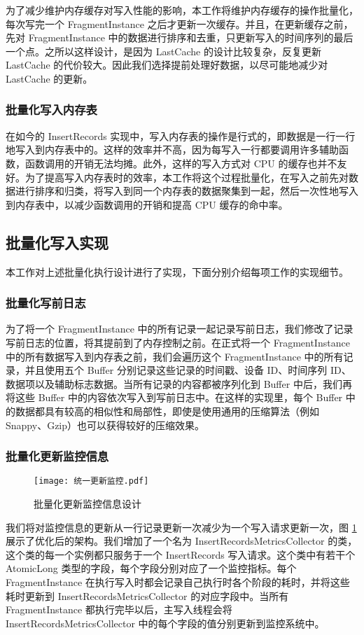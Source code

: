 为了减少维护内存缓存对写入性能的影响，本工作将维护内存缓存的操作批量化，每次写完一个 FragmentInstance 之后才更新一次缓存。并且，在更新缓存之前，先对 FragmentInstance 中的数据进行排序和去重，只更新写入的时间序列的最后一个点。之所以这样设计，是因为 LastCache 的设计比较复杂，反复更新 LastCache 的代价较大。因此我们选择提前处理好数据，以尽可能地减少对 LastCache 的更新。
\subsubsection{批量化写入内存表}
在如今的 InsertRecords 实现中，写入内存表的操作是行式的，即数据是一行一行地写入到内存表中的。这样的效率并不高，因为每写入一行都要调用许多辅助函数，函数调用的开销无法均摊。此外，这样的写入方式对 CPU 的缓存也并不友好\cite{boncz2005monetdb}。为了提高写入内存表时的效率，本工作将这个过程批量化，在写入之前先对数据进行排序和归类，将写入到同一个内存表的数据聚集到一起，然后一次性地写入到内存表中，以减少函数调用的开销和提高 CPU 缓存的命中率。

\subsection{批量化写入实现}
本工作对上述批量化执行设计进行了实现，下面分别介绍每项工作的实现细节。
\subsubsection{批量化写前日志}
为了将一个 FragmentInstance 中的所有记录一起记录写前日志，我们修改了记录写前日志的位置，将其提前到了内存控制之前。在正式将一个 FragmentInstance 中的所有数据写入到内存表之前，我们会遍历这个 FragmentInstance 中的所有记录，并且使用五个 Buffer 分别记录这些记录的时间戳、设备 ID、时间序列 ID、数据项以及辅助标志数据。当所有记录的内容都被序列化到 Buffer 中后，我们再将这些 Buffer 中的内容依次写入到写前日志中。在这样的实现里，每个 Buffer 中的数据都具有较高的相似性和局部性，即使是使用通用的压缩算法（例如 Snappy、Gzip）也可以获得较好的压缩效果。
\subsubsection{批量化更新监控信息}
\begin{figure}
  \centering
  \texttt{[image: 统一更新监控.pdf]}
  \caption{批量化更新监控信息设计}
  \label{fig:batch-update-monitor}
\end{figure}
我们将对监控信息的更新从一行记录更新一次减少为一个写入请求更新一次，图 \ref{fig:batch-update-monitor} 展示了优化后的架构。我们增加了一个名为 InsertRecordsMetricsCollector 的类，这个类的每一个实例都只服务于一个 InsertRecords 写入请求。这个类中有若干个 AtomicLong 类型的字段，每个字段分别对应了一个监控指标。每个 FragmentInstance 在执行写入时都会记录自己执行时各个阶段的耗时，并将这些耗时更新到 InsertRecordsMetricsCollector 的对应字段中。当所有 FragmentInstance 都执行完毕以后，主写入线程会将 InsertRecordsMetricsCollector 中的每个字段的值分别更新到监控系统中。

